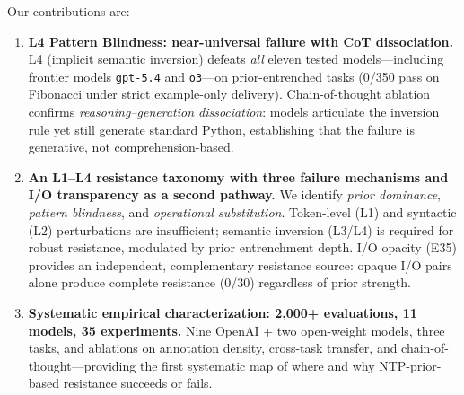 Our contributions are:
\begin{enumerate}
  \item \textbf{L4 Pattern Blindness: near-universal failure with CoT dissociation.} L4 (implicit semantic inversion) defeats \emph{all} eleven tested models---including frontier models \texttt{gpt-5.4} and \texttt{o3}---on prior-entrenched tasks (0/350 pass on Fibonacci under strict example-only delivery). Chain-of-thought ablation confirms \emph{reasoning--generation dissociation}: models articulate the inversion rule yet still generate standard Python, establishing that the failure is generative, not comprehension-based.
  \item \textbf{An L1--L4 resistance taxonomy with three failure mechanisms and I/O transparency as a second pathway.} We identify \emph{prior dominance}, \emph{pattern blindness}, and \emph{operational substitution}. Token-level (L1) and syntactic (L2) perturbations are insufficient; semantic inversion (L3/L4) is required for robust resistance, modulated by prior entrenchment depth. I/O opacity (E35) provides an independent, complementary resistance source: opaque I/O pairs alone produce complete resistance (0/30) regardless of prior strength.
  \item \textbf{Systematic empirical characterization: 2,000+ evaluations, 11 models, 35 experiments.} Nine OpenAI + two open-weight models, three tasks, and ablations on annotation density, cross-task transfer, and chain-of-thought---providing the first systematic map of where and why NTP-prior-based resistance succeeds or fails.
\end{enumerate}
